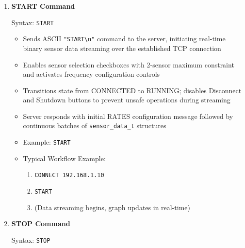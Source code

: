 \begin{enumerate}
    \item \textbf{START Command}

    Syntax: \texttt{START}

    \begin{itemize}
        \item Sends ASCII \texttt{"START\textbackslash n"} command to the server, initiating real-time binary sensor data streaming over the established TCP connection
        \item Enables sensor selection checkboxes with 2-sensor maximum constraint and activates frequency configuration controls
        \item Transitions state from CONNECTED to RUNNING; disables Disconnect and Shutdown buttons to prevent unsafe operations during streaming
        \item Server responds with initial RATES configuration message followed by continuous batches of \texttt{sensor\_data\_t} structures
        \item Example: \texttt{START}
        \item Typical Workflow Example:
        \begin{enumerate}
            \item \texttt{CONNECT 192.168.1.10}
            \item \texttt{START}
            \item (Data streaming begins, graph updates in real-time)
        \end{enumerate}
    \end{itemize}

    \item \textbf{STOP Command}

    Syntax: \texttt{STOP}


\end{enumerate}
